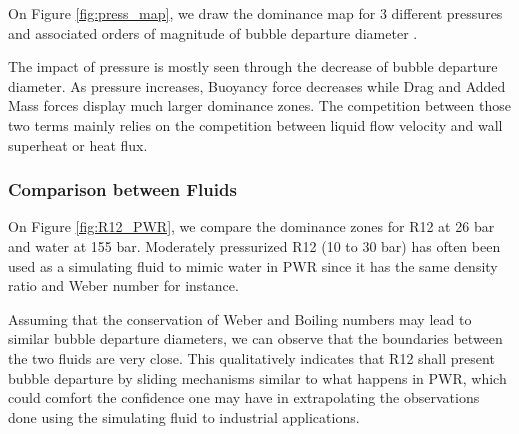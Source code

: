 On Figure \ref{fig:press_map}, we draw the dominance map for 3 different pressures and associated orders of magnitude of bubble departure diameter \cite{kocamustafaogullari_pressure_1983}.

The impact of pressure is mostly seen through the decrease of bubble departure diameter. As pressure increases, Buoyancy force decreases while Drag and Added Mass forces display much larger dominance zones. The competition between those two terms mainly relies on the competition between liquid flow velocity and wall superheat or heat flux.

 
\subsubsection{Comparison between Fluids}

 
On Figure \ref{fig:R12_PWR}, we compare the dominance zones for R12 at 26 bar and water at 155 bar. Moderately pressurized R12 (10 to 30 bar) has often been used as a simulating fluid to mimic water in PWR since it has the same density ratio and Weber number for instance.

Assuming that the conservation of Weber and Boiling numbers may lead to similar bubble departure diameters, we can observe that the boundaries between the two fluids are very close. This qualitatively indicates that R12 shall present bubble departure by sliding mechanisms similar to what happens in PWR, which could comfort the confidence one may have in extrapolating the observations done using the simulating fluid to industrial applications.






